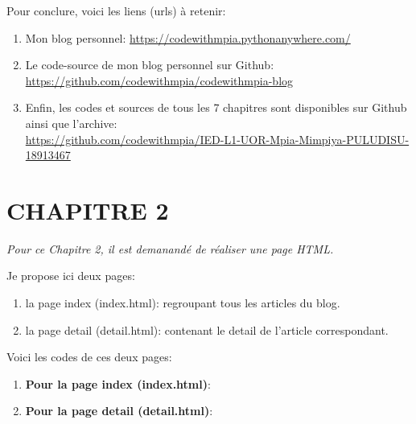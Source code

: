 \documentclass[a4paper,11pt]{article}
\begin{document}
        \bigskip
        \begin{tcolorbox}[colback=lightgray!6, colframe=black, left=1mm, right=2mm, top=2mm, bottom=1mm, boxrule=0.1mm]
            Pour conclure, voici les liens (urls) à retenir: 
            
            \begin{enumerate}
                \item Mon blog personnel: \url{https://codewithmpia.pythonanywhere.com/}
                \item Le code-source de mon blog personnel sur Github:\\ \url{https://github.com/codewithmpia/codewithmpia-blog}
                \item Enfin, les codes et sources de tous les 7 chapitres sont disponibles sur Github ainsi que l'archive:\\ 
                \url{https://github.com/codewithmpia/IED-L1-UOR-Mpia-Mimpiya-PULUDISU-18913467}
            \end{enumerate}
        \end{tcolorbox}

    \newpage
    \section{CHAPITRE 2}
        \noindent \textit{Pour ce Chapitre 2, il est demanandé de réaliser une page HTML.}

        \bigskip
        \noindent Je propose ici deux pages:
            \begin{enumerate}
                \item la page index (index.html): regroupant tous les articles du blog.
                \item la page detail (detail.html): contenant le detail de l'article correspondant.
            \end{enumerate}
        
        \bigskip
        \noindent Voici les codes de ces deux pages: 

        \begin{enumerate}
            \item \textbf{Pour la page index (index.html)}:
                
            \item   \textbf{Pour la page detail (detail.html)}:
                
        \end{enumerate}
\end{document}
